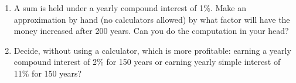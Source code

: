 \begin{multicols}{2}
\begin{enumerate}
\item A sum is held under a yearly compound interest of 1\%. Make an approximation by hand (no calculators allowed) by what factor will have the money increased after 200 years. Can you do the computation in your head?
\item Decide, without using a calculator, which is more profitable: earning a yearly compound interest of 2\% for 150 years or earning yearly simple interest of 11\% for 150 years?
\end{enumerate}
\end{multicols}